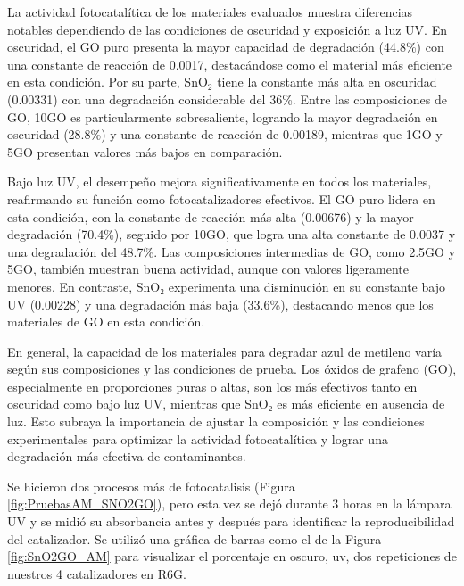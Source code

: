 \documentclass[12pt]{article}
\begin{document}
La actividad fotocatalítica de los materiales evaluados muestra diferencias notables dependiendo de las condiciones de oscuridad y exposición a luz UV. En oscuridad, el GO puro presenta la mayor capacidad de degradación (44.8\%) con una constante de reacción de 0.0017, destacándose como el material más eficiente en esta condición. Por su parte, SnO$\displaystyle _{2}$ tiene la constante más alta en oscuridad (0.00331) con una degradación considerable del 36\%. Entre las composiciones de GO, 10GO es particularmente sobresaliente, logrando la mayor degradación en oscuridad (28.8\%) y una constante de reacción de 0.00189, mientras que 1GO y 5GO presentan valores más bajos en comparación.\vspace{1em} %

Bajo luz UV, el desempeño mejora significativamente en todos los materiales, reafirmando su función como fotocatalizadores efectivos. El GO puro lidera en esta condición, con la constante de reacción más alta (0.00676) y la mayor degradación (70.4\%), seguido por 10GO, que logra una alta constante de 0.0037 y una degradación del 48.7\%. Las composiciones intermedias de GO, como 2.5GO y 5GO, también muestran buena actividad, aunque con valores ligeramente menores. En contraste, SnO₂ experimenta una disminución en su constante bajo UV (0.00228) y una degradación más baja (33.6\%), destacando menos que los materiales de GO en esta condición.\vspace{1em} %

En general, la capacidad de los materiales para degradar azul de metileno varía según sus composiciones y las condiciones de prueba. Los óxidos de grafeno (GO), especialmente en proporciones puras o altas, son los más efectivos tanto en oscuridad como bajo luz UV, mientras que SnO₂ es más eficiente en ausencia de luz. Esto subraya la importancia de ajustar la composición y las condiciones experimentales para optimizar la actividad fotocatalítica y lograr una degradación más efectiva de contaminantes.\vspace{1em} %

Se hicieron dos procesos más de fotocatalisis (Figura \ref{fig:PruebasAM_SNO2GO}), pero esta vez se dejó durante 3 horas en la lámpara UV y se midió su absorbancia antes y después para identificar la reproducibilidad del catalizador. Se utilizó una gráfica de barras como el de la Figura \ref{fig:SnO2GO_AM} para visualizar el porcentaje en oscuro, uv, dos repeticiones de nuestros 4 catalizadores en R6G.\vspace{1em} %
\end{document}
